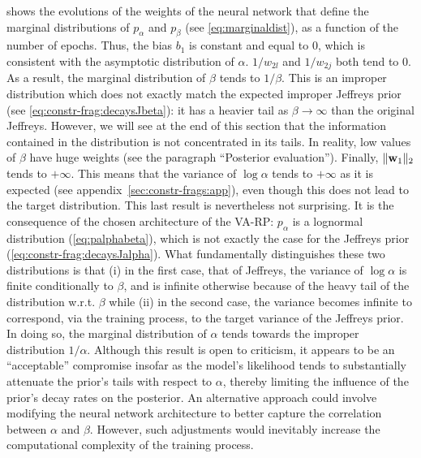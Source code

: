  shows the evolutions of the weights of the neural network that define the marginal distributions of $p_\alpha$ and $p_\beta$ (see \cref{eq:marginaldist}), as a function of the number of epochs. Thus, the bias $b_1$ is constant and equal to $0$, which is consistent with the asymptotic distribution of $\alpha$. $1/w_{2l}$ and $1/w_{2j}$ both tend to $0$. As a result, the marginal distribution of $\beta$ tends to $1/\beta$. This is an improper distribution which does not exactly match the expected improper Jeffreys prior (see \cref{eq:constr-frag:decaysJbeta}): it has a heavier tail as $\beta\to\infty$ than the original Jeffreys. 
However, we will see at the end of this section that the information contained in the distribution is not concentrated in its tails. In reality, low values of $\beta$ have huge weights
(see the paragraph ``Posterior evaluation''). Finally, $\|\mathbf{w}_1\|_2$ tends to $+\infty$. This means that the variance of  $\log\alpha$ tends to $+\infty$ as it is expected (see appendix~\ref{sec:constr-frags:app}), even though this does not lead to the target distribution. This last result is nevertheless not surprising. It is the consequence of the chosen architecture of the VA-RP: $p_\alpha$ is a lognormal distribution (\cref{eq:palphabeta}), which is not exactly the case for the Jeffreys prior (\cref{eq:constr-frag:decaysJalpha}). What fundamentally distinguishes these two distributions is that (i) in the first case, that of Jeffreys, the variance of $\log\alpha$ is finite conditionally to $\beta$, and is infinite otherwise because of the heavy tail of the distribution w.r.t. $\beta$ %
while (ii) in the second case, the variance becomes infinite to correspond, via the training process, to the target variance of the Jeffreys prior. In doing so, the marginal distribution of $\alpha$ tends towards the improper distribution $1/\alpha$. Although this result is open to criticism, it appears to be an ``acceptable'' compromise insofar as the model's likelihood tends to substantially attenuate the prior's tails with respect to $\alpha$, thereby limiting the influence of the prior's decay rates on the posterior. An alternative approach could involve modifying the neural network architecture to better capture the correlation between $\alpha$ and $\beta$. However, such adjustments would inevitably increase the computational complexity of the training process.


